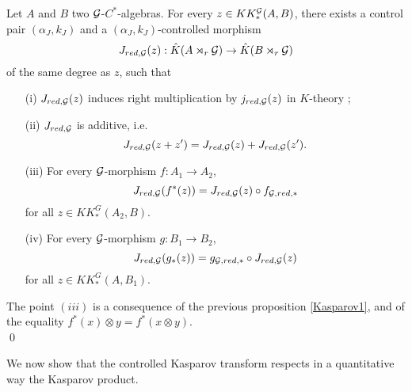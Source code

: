 \begin{prop}
Let $A$ and $B$ two $\mathcal G$-$C^*$-algebras. For every $z\in KK^\mathcal G_*(A,B)$, there exists a control pair $(\alpha_J,k_J)$ and a $(\alpha_J,k_J)$-controlled morphism
\[J_{red,\mathcal G}(z) : \hat K(A\rtimes_r \mathcal G)\rightarrow \hat K(B\rtimes_r \mathcal G)\]
of the same degree as $z$, such that
\begin{enumerate}
\item[(i)] $J_{red,\mathcal G}(z)$ induces right multiplication by $j_{red,\mathcal G}(z)$ in $K$-theory ;
\item[(ii)] $J_{red,\mathcal G}$ is additive, i.e.
\[J_{red,\mathcal G}(z+z')=J_{red,\mathcal G}(z)+J_{red,\mathcal G}(z').\]
\item[(iii)] For every $\mathcal G$-morphism $f : A_1\rightarrow A_2$,
\[J_{red,\mathcal G}(f^*(z))=J_{red,\mathcal G}(z)\circ f_{\mathcal G,red,*}\] for all $z\in KK_*^G(A_2,B)$.
\item[(iv)] For every $\mathcal G$-morphism $g : B_1\rightarrow B_2$,
\[J_{red,\mathcal G}(g_*(z))= g_{\mathcal G,red,*}\circ J_{red,\mathcal G}(z)\] for all $z\in KK_*^G(A,B_1)$.
\end{enumerate}
\end{prop}

\begin{dem}
The point $(iii)$ is a consequence of the previous proposition \ref{Kasparov1}, and of the equality $f^*(x)\otimes y = f^*(x\otimes y)$.\\
\qed
\end{dem}

We now show that the controlled Kasparov transform respects in a quantitative way the Kasparov product.

